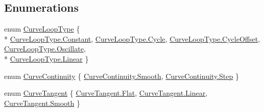 \subsection*{Enumerations}
\begin{DoxyCompactItemize}
\item 
enum \hyperlink{namespace_microsoft_1_1_xna_1_1_framework_a0048636d6bb1cfa15d5b7dbbb649ffc0}{Curve\+Loop\+Type} \{ \\*
\hyperlink{namespace_microsoft_1_1_xna_1_1_framework_a0048636d6bb1cfa15d5b7dbbb649ffc0acb17869fe51048b5a5c4c6106551a255}{Curve\+Loop\+Type.\+Constant}, 
\hyperlink{namespace_microsoft_1_1_xna_1_1_framework_a0048636d6bb1cfa15d5b7dbbb649ffc0a46e4c9ef8686e58a89edb553aba6d938}{Curve\+Loop\+Type.\+Cycle}, 
\hyperlink{namespace_microsoft_1_1_xna_1_1_framework_a0048636d6bb1cfa15d5b7dbbb649ffc0aef883ed0305ad565fcc01609934ab6c2}{Curve\+Loop\+Type.\+Cycle\+Offset}, 
\hyperlink{namespace_microsoft_1_1_xna_1_1_framework_a0048636d6bb1cfa15d5b7dbbb649ffc0a2a88b6fd7087f774703ffe319524bdc4}{Curve\+Loop\+Type.\+Oscillate}, 
\\*
\hyperlink{namespace_microsoft_1_1_xna_1_1_framework_a0048636d6bb1cfa15d5b7dbbb649ffc0a32a843da6ea40ab3b17a3421ccdf671b}{Curve\+Loop\+Type.\+Linear}
 \}
\item 
enum \hyperlink{namespace_microsoft_1_1_xna_1_1_framework_aa1e1dcccc97fa3f52759aa5807d9a326}{Curve\+Continuity} \{ \hyperlink{namespace_microsoft_1_1_xna_1_1_framework_aa1e1dcccc97fa3f52759aa5807d9a326ae510cdf33cd497134b47b9316314d4b4}{Curve\+Continuity.\+Smooth}, 
\hyperlink{namespace_microsoft_1_1_xna_1_1_framework_aa1e1dcccc97fa3f52759aa5807d9a326a48c7c41b72e1d678923ce3571aa65b2d}{Curve\+Continuity.\+Step}
 \}
\item 
enum \hyperlink{namespace_microsoft_1_1_xna_1_1_framework_a37eb63dcaa40d88c5b3a4d73cd70c38c}{Curve\+Tangent} \{ \hyperlink{namespace_microsoft_1_1_xna_1_1_framework_a37eb63dcaa40d88c5b3a4d73cd70c38ca745e3db6a7ffd50e1a72b39482f0882d}{Curve\+Tangent.\+Flat}, 
\hyperlink{namespace_microsoft_1_1_xna_1_1_framework_a37eb63dcaa40d88c5b3a4d73cd70c38ca32a843da6ea40ab3b17a3421ccdf671b}{Curve\+Tangent.\+Linear}, 
\hyperlink{namespace_microsoft_1_1_xna_1_1_framework_a37eb63dcaa40d88c5b3a4d73cd70c38cae510cdf33cd497134b47b9316314d4b4}{Curve\+Tangent.\+Smooth}
 \}
\end{DoxyCompactItemize}


